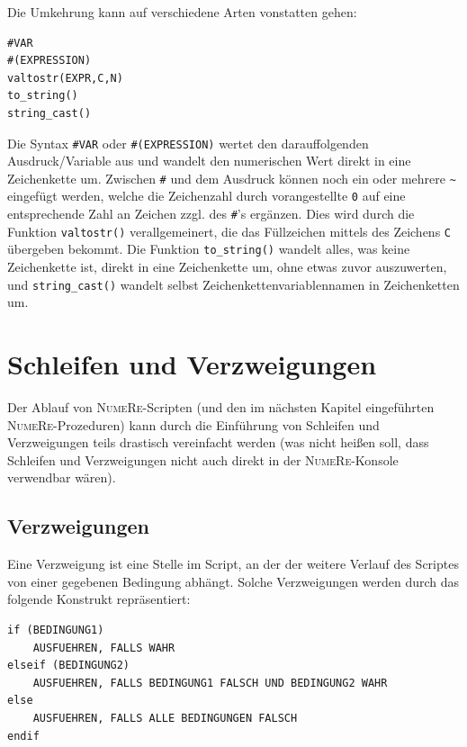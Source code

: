 \documentclass[DIV=14,headsepline,footsepline]{scrbook}
\newcommand{\NR}{\textsc{Nu\-me\-Re}}
\begin{document}
				Die Umkehrung kann auf verschiedene Arten vonstatten gehen:
				\begin{lstlisting}
#VAR
#(EXPRESSION)
valtostr(EXPR,C,N)
to_string()
string_cast()
				\end{lstlisting}
				Die Syntax \lstinline+#VAR+ oder \lstinline+#(EXPRESSION)+ wertet den darauffolgenden Ausdruck/Variable aus und wandelt den numerischen Wert direkt in eine Zeichenkette um. Zwischen \lstinline+#+ und dem Ausdruck können noch ein oder mehrere \lstinline+~+ eingefügt werden, welche die Zeichenzahl durch vorangestellte \lstinline+0+ auf eine entsprechende Zahl an Zeichen zzgl. des \lstinline+#+'s ergänzen. Dies wird durch die Funktion \lstinline+valtostr()+ verallgemeinert, die das Füllzeichen mittels des Zeichens \lstinline+C+ übergeben bekommt. Die Funktion \lstinline+to_string()+ wandelt alles, was keine Zeichenkette ist, direkt in eine Zeichenkette um, ohne etwas zuvor auszuwerten, und \lstinline+string_cast()+ wandelt selbst Zeichenkettenvariablennamen in Zeichenketten um.
		\chapter{Schleifen und Verzweigungen}
			Der Ablauf von \NR-Scripten (und den im nächsten Kapitel eingeführten \NR-Pro\-ze\-du\-ren) kann durch die Einführung von Schleifen und Verzweigungen teils drastisch vereinfacht werden (was nicht heißen soll, dass Schleifen und Verzweigungen nicht auch direkt in der \NR-Konsole verwendbar wären).
			\section{Verzweigungen}
				Eine Verzweigung ist eine Stelle im Script, an der der weitere Verlauf des Scriptes von einer gegebenen Bedingung abhängt. Solche Verzweigungen werden durch das folgende Konstrukt repräsentiert:
				\begin{lstlisting}
if (BEDINGUNG1)
	AUSFUEHREN, FALLS WAHR
elseif (BEDINGUNG2)
	AUSFUEHREN, FALLS BEDINGUNG1 FALSCH UND BEDINGUNG2 WAHR
else
	AUSFUEHREN, FALLS ALLE BEDINGUNGEN FALSCH
endif
				\end{lstlisting}
				
\end{document}
